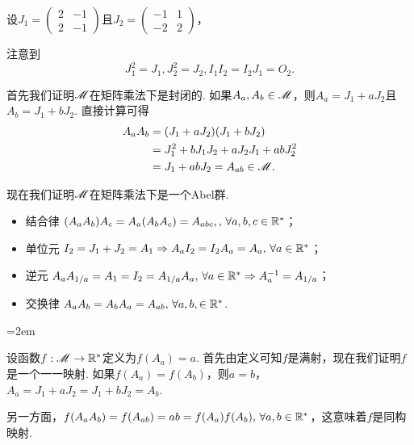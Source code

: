 \begin{solution}
  \begin{enuma}
    \item 设$J_1=\begin{pmatrix}
      2 & -1 \\
      2 & -1
    \end{pmatrix}$且$J_2=\begin{pmatrix}
      -1 & 1 \\
      -2 & 2
    \end{pmatrix}$，
  \end{enuma}
  注意到
  \[
    J_1^2 = J_1, J_2^2 = J_2, I_1I_2 = I_2J_1 = O_2.
  \]

    首先我们证明$\mathscr M$在矩阵乘法下是封闭的. 如果$A_a,A_b\in\mathscr M$，则$A_a=J_1+aJ_2$且$A_b=J_1+bJ_2$. 直接计算可得
  \begin{align*}
    A_aA_b & = (J_1+aJ_2)(J_1+bJ_2)\\
           & = J_1^2 + bJ_1J_2 + aJ_2J_1 + abJ_2^2\\
           & = J_1 + abJ_2 = A_{ab}\in\mathscr M.
  \end{align*}

  现在我们证明$\mathscr M$在矩阵乘法下是一个Abel群.
  \begin{itemize}
    \item {\kaishu 结合律} $(A_aA_b)A_c=A_a(A_bA_c)=A_{abc},,\,\forall a,b,c\in\mathbb R^\ast$；
    \item {\kaishu 单位元} $I_2=J_1+J_2=A_1\Rightarrow
           A_aI_2=I_2A_a=A_a,\,\forall a\in\mathbb R^\ast$；
    \item {\kaishu 逆元} $A_aA_{1/a}=A_1=I_2=A_{1/a}A_a,\,\forall
              a\in\mathbb R^\ast\Rightarrow A_a^{-1}=A_{1/a}$；
    \item {\kaishu 交换律} $A_aA_b=A_bA_a=A_{ab},\,\forall
         a,b,\in\mathbb R^\ast$.
  \end{itemize}

  \begin{enuma}\setcounter{enumi}{1}\parindent=2em
    \item 设函数$f:\mathscr M\to\mathbb R^\ast$定义为$f(A_a)=a$. 首先由定义可知$f$是满射，现在我们证明$f$是一个一一映射. 如果$f(A_a)=f(A_b)$，则$a=b$，$A_a=J_1+aJ_2=J_1+bJ_2=A_b$.

        另一方面，$f(A_aA_b)=f(A_{ab})=ab=f(A_a)f(A_b),\,\forall a,b\in\mathbb R^\ast$，这意味着$f$是同构映射.
  \end{enuma}
\end{solution}

